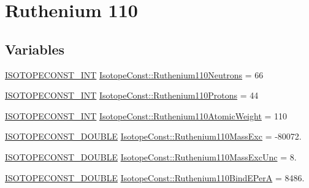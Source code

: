 \hypertarget{group___isotope_const-_ruthenium-_ru110}{}\section{Ruthenium 110}
\label{group___isotope_const-_ruthenium-_ru110}
\subsection*{Variables}
\begin{DoxyCompactItemize}
\item 
\mbox{\hyperlink{group___isotope_const-_macros_ga5f18360b3e99483a35c32d789e62621c}{I\+S\+O\+T\+O\+P\+E\+C\+O\+N\+S\+T\+\_\+\+I\+NT}} \mbox{\hyperlink{group___isotope_const-_ruthenium-_ru110_ga5c1014e856d401f0fa4311e050f50c7e}{Isotope\+Const\+::\+Ruthenium110\+Neutrons}} = 66
\item 
\mbox{\hyperlink{group___isotope_const-_macros_ga5f18360b3e99483a35c32d789e62621c}{I\+S\+O\+T\+O\+P\+E\+C\+O\+N\+S\+T\+\_\+\+I\+NT}} \mbox{\hyperlink{group___isotope_const-_ruthenium-_ru110_ga64c70292a18bf1181b8b9a61b5bb98c4}{Isotope\+Const\+::\+Ruthenium110\+Protons}} = 44
\item 
\mbox{\hyperlink{group___isotope_const-_macros_ga5f18360b3e99483a35c32d789e62621c}{I\+S\+O\+T\+O\+P\+E\+C\+O\+N\+S\+T\+\_\+\+I\+NT}} \mbox{\hyperlink{group___isotope_const-_ruthenium-_ru110_ga09f14150ec6d4fa9a827fa4f175c89c2}{Isotope\+Const\+::\+Ruthenium110\+Atomic\+Weight}} = 110
\item 
\mbox{\hyperlink{group___isotope_const-_macros_ga8f45a7272ce02c0b4c65c44636ed719a}{I\+S\+O\+T\+O\+P\+E\+C\+O\+N\+S\+T\+\_\+\+D\+O\+U\+B\+LE}} \mbox{\hyperlink{group___isotope_const-_ruthenium-_ru110_ga9c1e215d880eb22521b5308d5f316cf9}{Isotope\+Const\+::\+Ruthenium110\+Mass\+Exc}} = -\/80072.
\item 
\mbox{\hyperlink{group___isotope_const-_macros_ga8f45a7272ce02c0b4c65c44636ed719a}{I\+S\+O\+T\+O\+P\+E\+C\+O\+N\+S\+T\+\_\+\+D\+O\+U\+B\+LE}} \mbox{\hyperlink{group___isotope_const-_ruthenium-_ru110_ga196a0469ed487b27888195169544338f}{Isotope\+Const\+::\+Ruthenium110\+Mass\+Exc\+Unc}} = 8.
\item 
\mbox{\hyperlink{group___isotope_const-_macros_ga8f45a7272ce02c0b4c65c44636ed719a}{I\+S\+O\+T\+O\+P\+E\+C\+O\+N\+S\+T\+\_\+\+D\+O\+U\+B\+LE}} \mbox{\hyperlink{group___isotope_const-_ruthenium-_ru110_ga33c45939ccda4e21314089b8092fcba3}{Isotope\+Const\+::\+Ruthenium110\+Bind\+E\+PerA}} = 8486.
\item 

\end{DoxyCompactItemize}
